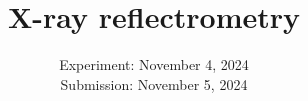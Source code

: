 

\publishers{TU Dortmund – Department of Physics}

\subject{\texorpdfstring{\vspace{2ex}}{}V44\texorpdfstring{\vspace{-2ex}}{}} %
\title{X-ray reflectrometry} %
\date{
	Experiment: November 4, 2024 %
	\\ Submission: November 5, 2024 %
}




\maketitle
\thispagestyle{empty}

\tableofcontents
\newpage








\printbibliography{}

\newpage



